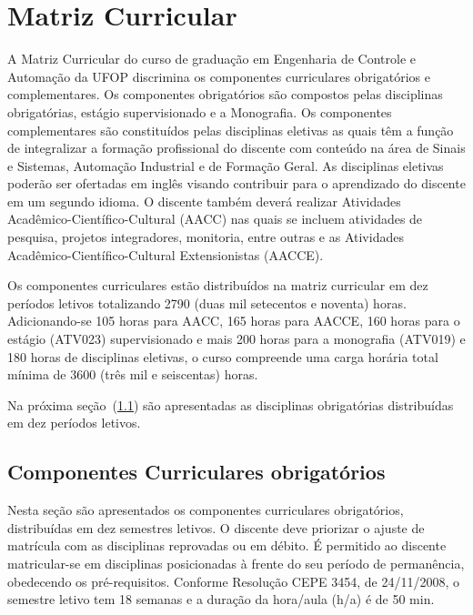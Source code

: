 \documentclass[
	12pt,				%
	openright,			%
	oneside,			%
	a4paper,			%
	english,			%
	brazil				%
	]{abntex2}
\begin{document}
\section{Matriz Curricular} \label{sec:matriz}

A Matriz Curricular do curso de graduação em Engenharia de Controle e Automação da UFOP discrimina os componentes curriculares obrigatórios e complementares. Os componentes obrigatórios são compostos pelas disciplinas obrigatórias, estágio supervisionado e a Monografia. Os componentes complementares são constituídos pelas disciplinas eletivas as quais têm a função de integralizar a formação profissional do discente com conteúdo na área de Sinais e Sistemas, Automação Industrial e de Formação Geral. As disciplinas eletivas poderão ser ofertadas em inglês visando contribuir para o aprendizado do discente em um segundo idioma. O discente também deverá realizar Atividades Acadêmico-Científico-Cultural (AACC) nas quais se incluem atividades de pesquisa, projetos integradores, monitoria, entre outras e as Atividades Acadêmico-Científico-Cultural Extensionistas (AACCE).

Os componentes curriculares estão distribuídos na matriz curricular em dez períodos letivos totalizando 2790 (duas mil setecentos e noventa) horas. Adicionando-se 105 horas para AACC, 165 horas para AACCE, 160 horas para o estágio (ATV023) supervisionado e mais 200 horas para a monografia (ATV019) e 180 horas de disciplinas eletivas, o curso compreende uma carga horária total mínima de 3600 (três mil e seiscentas) horas.

%
Na próxima seção~(\ref{tab:0402}) são apresentadas as disciplinas obrigatórias distribuídas em dez períodos letivos.

\subsection{Componentes Curriculares obrigatórios}\label{tab:0402}

Nesta seção são apresentados os componentes curriculares obrigatórios, distribuídas em dez semestres letivos. O discente deve priorizar o ajuste de matrícula com as disciplinas reprovadas ou em débito. É permitido ao discente matricular-se em disciplinas posicionadas à frente do seu período de permanência, obedecendo os pré-requisitos. Conforme Resolução CEPE 3454, de 24/11/2008, o semestre letivo tem 18 semanas e a duração da hora/aula (h/a) é de 50 min.


\end{document}
